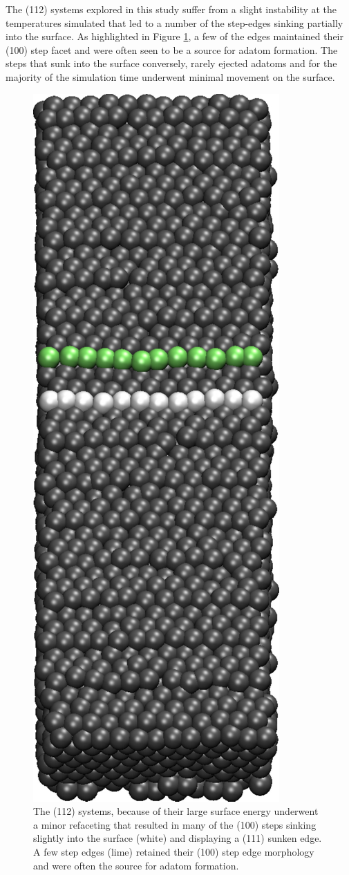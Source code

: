 The (112) systems explored in this study suffer from a slight instability at
the temperatures simulated that led to a number of the step-edges sinking
partially into the surface. As highlighted in Figure \ref{fig:112sunken}, a few
of the edges maintained their (100) step facet and were often seen to be a
source for adatom formation. The steps that sunk into the surface conversely,
rarely ejected adatoms and for the majority of the simulation time underwent
minimal movement on the surface.

\begin{figure}
\centering
\includegraphics[width=0.3\linewidth]{../figures/appB/112_sunken.pdf}
\caption{The (112) systems, because of their large surface energy underwent a
minor refaceting that resulted in many of the (100) steps sinking slightly into
the surface (white) and displaying a (111) sunken edge. A few step edges (lime)
retained their (100) step edge morphology and were often the source for adatom
formation.}
\label{fig:112sunken}
\end{figure}
\newpage




